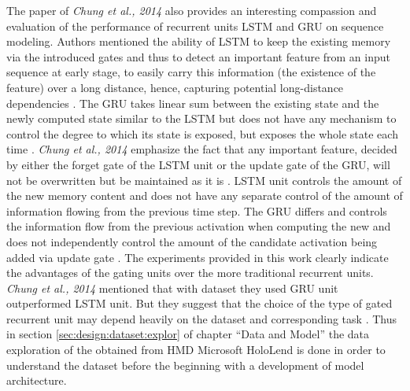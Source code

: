 The paper of \textit{Chung et al., 2014}  also provides an interesting compassion and evaluation of the performance of recurrent units LSTM and GRU on sequence modeling. Authors mentioned the ability of LSTM to keep the existing memory via the introduced gates and thus to detect an important feature from an input sequence at early stage, to easily carry this information (the existence of the feature) over a long distance, hence, capturing potential long-distance dependencies \cite{empirical_evaluation}. The GRU takes linear sum between the existing state and the newly computed state similar to the LSTM but does not have any mechanism to control the degree to which its state is exposed, but exposes the whole state each time \cite{empirical_evaluation}. \textit{Chung et al., 2014} emphasize the fact that any important feature, decided by either the forget gate of the LSTM unit or the update gate of the GRU, will not be overwritten but be maintained as it is \cite{empirical_evaluation}. LSTM unit controls the amount of the new memory content and does not have any separate control of the amount of information flowing from the previous time step. The GRU differs and controls the information flow from the previous activation when computing the new and does not independently control the amount of the candidate activation being added via update gate \cite{empirical_evaluation}. The experiments provided in this work clearly indicate the advantages of the gating units over the more traditional recurrent units. \textit{Chung et al., 2014} mentioned that with dataset they used GRU unit outperformed LSTM unit. But they suggest that the choice of the type of gated recurrent unit may depend heavily on the dataset and corresponding task \cite{empirical_evaluation}. Thus in section \ref{sec:design:dataset:explor} of chapter ``Data and Model'' the data exploration of the obtained from HMD Microsoft HoloLend is done in order to understand the dataset before the beginning with a development of model architecture. 
